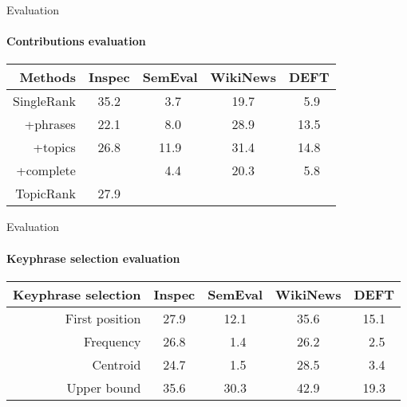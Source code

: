   \begin{frame}{Evaluation}
    \framesubtitle{Contributions evaluation}
    
    \begin{center}
      \begin{tabular}{rcccc}
        \toprule
        Methods & Inspec & SemEval & WikiNews & DEFT\\
        \midrule
        SingleRank & 35.2 & $~~$3.7 & 19.7 & $~~$5.9\\
        +phrases & 22.1 & $~~$8.0 & 28.9 & 13.5\\
        +topics & 26.8 & 11.9 & 31.4 & 14.8\\
        +complete &  \cellcolor{pink}{35.5} & $~~$4.4 & 20.3 & $~~$5.8\\
        TopicRank & 27.9 & \cellcolor{pink}{12.1} & \cellcolor{pink}{35.6} & \cellcolor{pink}{15.1}\\
        \bottomrule
      \end{tabular}
    \end{center}
  \end{frame}

  \begin{frame}{Evaluation}
    \framesubtitle{Keyphrase selection evaluation}
    
    \begin{center}
      \begin{tabular}{rcccc}
        \toprule
        Keyphrase selection & Inspec & SemEval & WikiNews & DEFT\\
        \midrule
        \rowcolor{cyan!33} First position & 27.9 & 12.1 & 35.6 & 15.1\\
        Frequency & 26.8 & $~~$1.4 & 26.2 & $~~$2.5\\
        Centroid &  24.7 & $~~$1.5 & 28.5 & $~~$3.4\\
        \rowcolor{pink} Upper bound & 35.6 & 30.3 & 42.9 & 19.3\\
        \bottomrule
      \end{tabular}
    \end{center}
  \end{frame}

